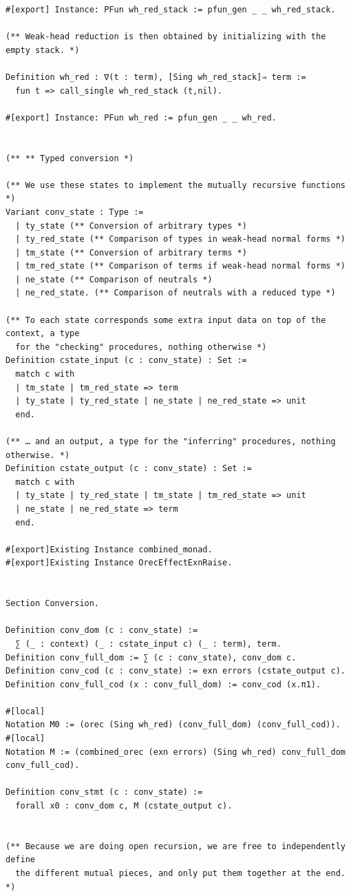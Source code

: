 \documentclass[10pt,a4paper]{amsart}
\begin{document}
\begin{lstlisting}
#[export] Instance: PFun wh_red_stack := pfun_gen _ _ wh_red_stack.

(** Weak-head reduction is then obtained by initializing with the empty stack. *)

Definition wh_red : ∇(t : term), [Sing wh_red_stack]⇒ term :=
  fun t => call_single wh_red_stack (t,nil).

#[export] Instance: PFun wh_red := pfun_gen _ _ wh_red.


(** ** Typed conversion *)

(** We use these states to implement the mutually recursive functions *)
Variant conv_state : Type :=
  | ty_state (** Conversion of arbitrary types *)
  | ty_red_state (** Comparison of types in weak-head normal forms *)
  | tm_state (** Conversion of arbitrary terms *)
  | tm_red_state (** Comparison of terms if weak-head normal forms *)
  | ne_state (** Comparison of neutrals *)
  | ne_red_state. (** Comparison of neutrals with a reduced type *)

(** To each state corresponds some extra input data on top of the context, a type
  for the "checking" procedures, nothing otherwise *)
Definition cstate_input (c : conv_state) : Set :=
  match c with
  | tm_state | tm_red_state => term
  | ty_state | ty_red_state | ne_state | ne_red_state => unit
  end.

(** … and an output, a type for the "inferring" procedures, nothing otherwise. *)
Definition cstate_output (c : conv_state) : Set :=
  match c with
  | ty_state | ty_red_state | tm_state | tm_red_state => unit
  | ne_state | ne_red_state => term
  end.

#[export]Existing Instance combined_monad.
#[export]Existing Instance OrecEffectExnRaise.


Section Conversion.

Definition conv_dom (c : conv_state) :=
  ∑ (_ : context) (_ : cstate_input c) (_ : term), term.
Definition conv_full_dom := ∑ (c : conv_state), conv_dom c.
Definition conv_cod (c : conv_state) := exn errors (cstate_output c).
Definition conv_full_cod (x : conv_full_dom) := conv_cod (x.π1).

#[local]
Notation M0 := (orec (Sing wh_red) (conv_full_dom) (conv_full_cod)).
#[local]
Notation M := (combined_orec (exn errors) (Sing wh_red) conv_full_dom conv_full_cod).

Definition conv_stmt (c : conv_state) :=
  forall x0 : conv_dom c, M (cstate_output c).


(** Because we are doing open recursion, we are free to independently define
  the different mutual pieces, and only put them together at the end. *)


\end{lstlisting}
\end{document}

